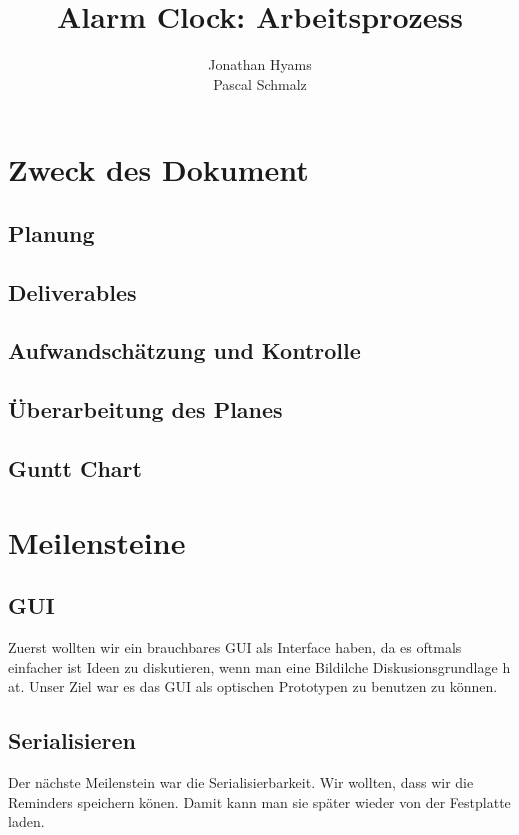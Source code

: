 \documentclass[11pt,titelpage]{scrartcl}
\title{Alarm Clock: Arbeitsprozess }
\author{Jonathan Hyams \\Pascal Schmalz}
\begin{document}
\thispagestyle{empty}
\maketitle
\pagebreak
\tableofcontents

\pagestyle{fancy}


\begin{abstract}
\end{abstract}
\pagebreak


\section{Zweck des Dokument}
\subsection{Planung}

\subsection{Deliverables}
\subsection{Aufwandschätzung und Kontrolle}
\subsection{Überarbeitung des Planes}
\subsection{Guntt Chart}
\section{Meilensteine}
\subsection{GUI}
Zuerst wollten wir ein brauchbares GUI als Interface haben, da es oftmals einfacher ist Ideen zu diskutieren, wenn man eine Bildilche Diskusionsgrundlage h at. Unser Ziel war es das GUI als optischen Prototypen zu benutzen zu können.

\subsection{Serialisieren}
Der nächste Meilenstein war die Serialisierbarkeit. Wir wollten, dass wir die Reminders speichern könen. Damit kann man sie später wieder von der Festplatte laden.
\end{document}
